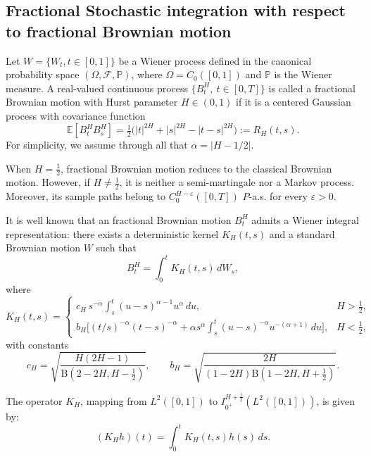 \documentclass[preprint,12pt]{elsarticle}
\theoremstyle{definition}  %
\theoremstyle{plain}  %
\begin{document}
  	
  	
	
	



\subsection{Fractional Stochastic integration with respect to fractional Brownian motion}
      Let $W=\{W_t,t\in [0,1] \}$ be a Wiener process defined in the canonical probability space $(\Omega,\mathcal{F},\mathbb{P})$, where 
 $\Omega=C_0([0,1])$
   and $\mathbb{P}$ is the Wiener measure.
	A real-valued continuous process $\{B^H_t,\ t\in [0,T]\}$ is called a fractional Brownian motion with Hurst parameter $H\in (0,1)$ if it is a centered Gaussian process with covariance function  
\[
  \mathbb{E}[B^H_tB^H_s]
  = \tfrac{1}{2}\big(|t|^{2H}+|s|^{2H}-|t-s|^{2H}\big)
  := R_H(t,s).
\]
For simplicity, we assume through all that $\alpha = |H - 1/2|$.

When $H=\tfrac{1}{2}$, fractional Brownian motion reduces to the classical Brownian motion.  
However, if $H\neq \tfrac{1}{2}$, it is neither a semi-martingale nor a Markov process. Moreover, its sample paths belong to $C^{H-\varepsilon}_0([0,T])$ $P$-a.s. for every $\varepsilon>0$.

It is well known that an fractional Brownian motion $B^H_t$ admits a Wiener integral representation: there exists a deterministic kernel $K_H(t,s)$ and a standard Brownian motion $W$ such that  
\[
  B^H_t = \int_0^t K_H(t,s)\,dW_s,
\]
where
\[
  K_H(t,s)=
  \begin{cases}
    c_H\, s^{-\alpha}\displaystyle\int_s^t (u-s)^{\alpha-1}u^\alpha\,du, & H>\tfrac{1}{2}, \\[2ex]
    b_H\Big[(t/s)^{-\alpha}(t-s)^{-\alpha}
    +\alpha s^\alpha \int_s^t (u-s)^{-\alpha}u^{-(\alpha+1)}\,du\Big], & H<\tfrac{1}{2},
  \end{cases}
\]
with constants
\[
  c_H=\sqrt{\frac{H(2H-1)}{\mathrm{B}(2-2H,H-\tfrac{1}{2})}}, 
  \qquad 
  b_H=\sqrt{\frac{2H}{(1-2H)\mathrm{B}(1-2H,H+\tfrac{1}{2})}}.
\]

The operator \( K_H \), mapping from \( L^2([0,1]) \) to \( I_{0^+}^{H+\frac{1}{2}}(L^2([0,1])) \), is given by:  
\begin{equation}
	(K_Hh)(t) = \int_0^t K_H(t,s) h(s) \, ds.\label{kh operator}
\end{equation}
\end{document}

